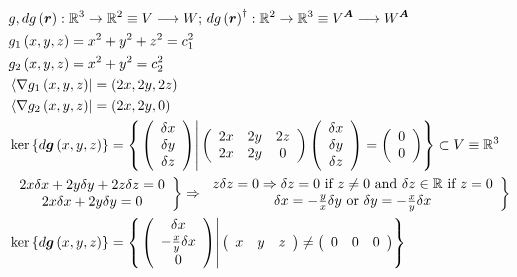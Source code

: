 \documentclass[aps,preprint]{revtex4}%
\begin{document}
\begin{align*}
&  g,dg\left(  \boldsymbol{r}\right)  :\mathbb{R}^{3}\rightarrow\mathbb{R}%
^{2}\equiv V\longrightarrow W;\,dg\left(  \boldsymbol{r}\right)  ^{\dagger
}:\mathbb{R}^{2}\rightarrow\mathbb{R}^{3}\equiv V^{\boldsymbol{A}%
}\longrightarrow W^{\boldsymbol{A}}\\
&  g_{1}\left(  x,y,z\right)  =x^{2}+y^{2}+z^{2}=c_{1}^{2}\\
&  g_{2}\left(  x,y,z\right)  =x^{2}+y^{2}=c_{2}^{2}\\
&  \left\langle \nabla g_{1}\left(  x,y,z\right)  \right\vert =\left(
2x,2y,2z\right) \\
&  \left\langle \nabla g_{2}\left(  x,y,z\right)  \right\vert =\left(
2x,2y,0\right) \\
&  \ker\left\{  d\boldsymbol{g}\left(  x,y,z\right)  \right\}  =\left\{
\left.  \left(
\begin{array}
[c]{c}%
\delta x\\
\delta y\\
\delta z
\end{array}
\right)  \right\vert \left(
\begin{array}
[c]{ccc}%
2x & 2y & 2z\\
2x & 2y & 0
\end{array}
\right)  \left(
\begin{array}
[c]{c}%
\delta x\\
\delta y\\
\delta z
\end{array}
\right)  =\left(
\begin{array}
[c]{c}%
0\\
0
\end{array}
\right)  \right\}  \subset V\equiv\mathbb{R}^{3}\\
&  \left.
\begin{array}
[c]{c}%
2x\delta x+2y\delta y+2z\delta z=0\\
2x\delta x+2y\delta y=0
\end{array}
\right\}  \Rightarrow\left.
\begin{array}
[c]{c}%
z\delta z=0\Rightarrow\delta z=0\text{ if }z\neq0\text{ and }\delta
z\in\mathbb{R}\text{ if }z=0\\
\delta x=-\frac{y}{x}\delta y\text{ or }\delta y=-\frac{x}{y}\delta x
\end{array}
\right\} \\
&  \ker\left\{  d\boldsymbol{g}\left(  x,y,z\right)  \right\}  =\left\{
\left.  \left(
\begin{array}
[c]{c}%
\delta x\\
-\frac{x}{y}\delta x\\
0
\end{array}
\right)  \right\vert \left(
\begin{array}
[c]{ccc}%
x & y & z
\end{array}
\right)  \neq\left(
\begin{array}
[c]{ccc}%
0 & 0 & 0
\end{array}
\right)  \right\}
\end{align*}
\end{document}
